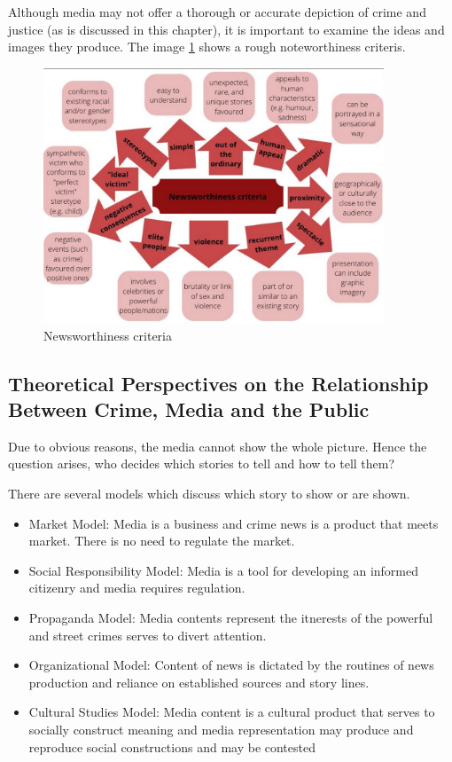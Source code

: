 \documentclass{article}
\begin{document}
Although media may not offer a thorough or accurate depiction of crime and justice (as is discussed in this chapter), it is important to examine the ideas and images they produce. The  image \ref{Newsworthy} shows a rough noteworthiness criteris.

\begin{figure}
    \begin{center}
        \includegraphics[width = 4in]{Newsworthy.png}
    \end{center}
    \caption{Newsworthiness criteria \cite{ref: Newsworthiness Criteria Image}}
    \label{Newsworthy}
\end{figure}

\subsection{Theoretical Perspectives on the Relationship Between Crime, Media and the Public}

Due to obvious reasons, the media cannot show the whole picture. Hence the question arises, who decides which stories to tell and how to tell them?

There are several models which discuss which story to show or are shown.

\begin{itemize}
    \item Market Model: Media is a business and crime news is a product that meets market. There is no need to regulate the market.
    
    \item Social Responsibility Model: Media is a tool for developing an informed citizenry and media requires regulation.
    
    \item Propaganda Model: Media contents represent the itnerests of the powerful and street crimes serves to divert attention.
    
    \item Organizational Model: Content of news is dictated by the routines of news production and reliance on established sources and story lines.
    
    \item Cultural Studies Model: Media content is a cultural product that serves to socially construct meaning and media representation may produce and reproduce social constructions and may be contested
\end{itemize}
\end{document}
